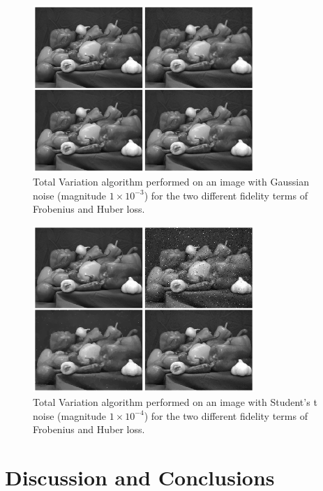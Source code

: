 \documentclass[10pt,a4paper]{article}
\begin{document}
\begin{figure}[H]
\begin{center}
\includegraphics[width = 0.75\textwidth]{../figures/gaussian_peppers.png} 
\end{center}
\caption{Total Variation algorithm performed on an image with Gaussian noise (magnitude $1 \times 10^{-3}$) for the two different fidelity terms of Frobenius and Huber loss.}
\label{tv_gauss}
\end{figure}

\begin{figure}[H]
\begin{center}
\includegraphics[width = 0.75\textwidth]{../figures/student-t_peppers.png} 
\end{center}
\caption{Total Variation algorithm performed on an image with Student's t noise (magnitude $1 \times 10^{-4}$) for the two different fidelity terms of Frobenius and Huber loss.}
\label{tv_student}
\end{figure}

\section{Discussion and Conclusions}



\end{document}
